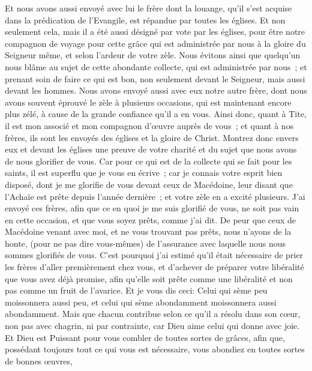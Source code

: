 \begin{multicols}{2}
Et nous avons aussi envoyé avec lui le frère dont la louange, qu'il s'est acquise dans la prédication de l'Evangile, est répandue par toutes les églises.
Et non seulement cela, mais il a été aussi désigné par vote par les églises, pour être notre compagnon de voyage pour cette grâce qui est administrée par nous à la gloire du Seigneur même, et selon l'ardeur de votre zèle.
Nous évitons ainsi que quelqu'un nous blâme au sujet de cette abondante collecte, qui est administrée par nous~;
et prenant soin de faire ce qui est bon, non seulement devant le Seigneur, mais aussi devant les hommes.
Nous avons envoyé aussi avec eux notre autre frère, dont nous avons souvent éprouvé le zèle à plusieurs occasions, qui est maintenant encore plus zélé, à cause de la grande confiance qu'il a en vous.
Ainsi donc, quant à Tite, il est mon associé et mon compagnon d'œuvre auprès de vous~; et quant à nos frères, ils sont les envoyés des églises et la gloire de Christ.
Montrez donc envers eux et devant les églises une preuve de votre charité et du sujet que nous avons de nous glorifier de vous.
\VerseOne{}Car pour ce qui est de la collecte qui se fait pour les saints, il est superflu que je vous en écrive~;
car je connais votre esprit bien disposé, dont je me glorifie de vous devant ceux de Macédoine, leur disant que l'Achaïe est prête depuis l'année dernière~; et votre zèle en a excité plusieurs.
J'ai envoyé ces frères, afin que ce en quoi je me suis glorifié de vous, ne soit pas vain en cette occasion, et que vous soyez prêts, comme j'ai dit.
De peur que ceux de Macédoine venant avec moi, et ne vous trouvant pas prêts, nous n'ayons de la honte, (pour ne pas dire vous-mêmes) de l'assurance avec laquelle nous nous sommes glorifiés de vous.
C'est pourquoi j'ai estimé qu'il était nécessaire de prier les frères d'aller premièrement chez vous, et d'achever de préparer votre libéralité que vous avez déjà promise, afin qu'elle soit prête comme une libéralité et non pas comme un fruit de l'avarice.
Et je vous dis ceci: Celui qui sème peu moissonnera aussi peu, et celui qui sème abondamment moissonnera aussi abondamment.
Mais que chacun contribue selon ce qu'il a résolu dans son cœur, non pas avec chagrin, ni par contrainte, car Dieu aime celui qui donne avec joie.
Et Dieu est Puissant pour vous combler de toutes sortes de grâces, afin que, possédant toujours tout ce qui vous est nécessaire, vous abondiez en toutes sortes de bonnes œuvres,

\end{multicols}
